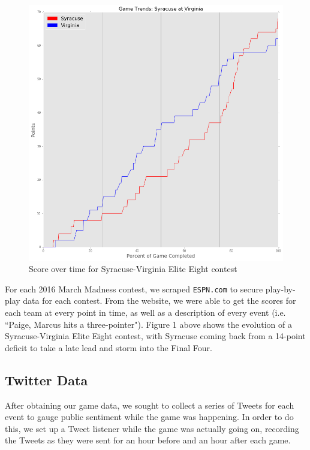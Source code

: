 \documentclass[12pt]{article}
\begin{document}
\begin{doublespacing}
\begin{figure} [H]
	\centering
	\includegraphics[scale = 0.4] {Images/Cuse_UVA_MarginOverTime.png} 
	\caption{Score over time for Syracuse-Virginia Elite Eight contest}
\end{figure}

For each 2016 March Madness contest, we scraped \texttt{ESPN.com} to secure play-by-play data for each contest. From the website, we were able to get the scores for each team at every point in time, as well as a description of every event (i.e. ``Paige, Marcus hits a three-pointer"). Figure 1 above shows the evolution of a Syracuse-Virginia Elite Eight contest, with Syracuse coming back from a 14-point deficit to take a late lead and storm into the Final Four. 

\subsection{Twitter Data}

After obtaining our game data, we sought to collect a series of Tweets for each event to gauge public sentiment while the game was happening. In order to do this, we set up a Tweet listener while the game was actually going on, recording the Tweets as they were sent for an hour before and an hour after each game. 


\end{doublespacing}
\end{document}
